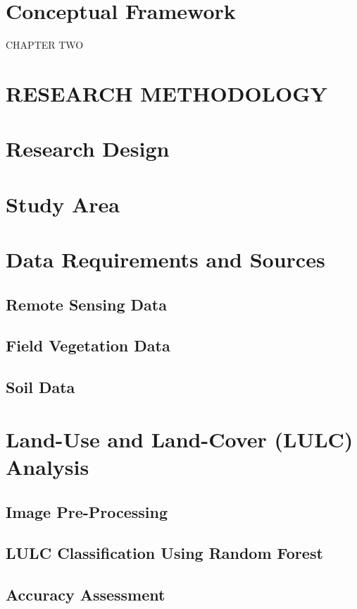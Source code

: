 \section{Conceptual Framework}
\label{section:1-6}

CHAPTER TWO 
\section{RESEARCH METHODOLOGY}
\label{section:2-0}
\section{Research Design}
\label{section:2-1}
\section{Study Area}
\label{section:2-2}
\section{Data Requirements and Sources}
\label{section:2-3}
\subsection{Remote Sensing Data}
\label{subsection:2-3-1}
\subsection{Field Vegetation Data}
\label{subsection:2-3-2}
\subsection{Soil Data}
\label{subsection:2-3-3}
\section{Land-Use and Land-Cover (LULC) Analysis}
\label{section:2-4}
\subsection{Image Pre-Processing}
\label{subsection:2-4-1}
\subsection{LULC Classification Using Random Forest}
\label{subsection:2-4-2}
\subsection{Accuracy Assessment}
\label{subsection:2-4-3}
